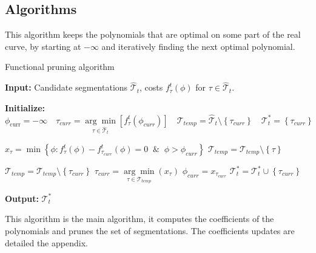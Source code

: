 \documentclass[11pt]{article}
\begin{document}
\subsection{Algorithms}
\label{appendix:algorithms}
This algorithm keeps the polynomials that are optimal on some part of the real curve, by starting at $-\infty$ and iteratively finding the next optimal polynomial.
\begin{algorithm}[H]
    \caption{Functional pruning algorithm}
    \begin{algorithmic}[1]
        \State \textbf{Input:} Candidate segmentations $\hat{\mathcal{T}}_{t}$, costs $f^{t}_{{\tau}}(\phi)$ for ${\tau}\in\hat{\mathcal{T}}_{t}$.

        \State \textbf{Initialize:} $\phi_\text{curr}=-\infty \quad {\tau}_{curr}=\underset{{\tau}\in\hat{\mathcal{T}}_{t}}{ \arg\min}\left[f^{t}_{{\tau}}(\phi_{curr})\right]\quad \mathcal{T}_{temp}=\hat{\mathcal{T}}_{t}\setminus \left\{\tau_{curr}\right\}\quad \mathcal{T}^*_t=\left\{\tau_{curr}\right\}$


        \State $x_{\tau}=\min\left\{\phi:f^{t}_{\tau}(\phi)-f^{t}_{{\tau}_{curr}}(\phi)=0\;\;\&\;\;\phi>\phi_{curr}\right\}$
        \State $\mathcal{T}_{temp}=\mathcal{T}_{temp}\setminus\left\{\tau\right\}$
        \EndIf
        \EndFor

        \State $\mathcal{T}_{temp}=\mathcal{T}_{temp}\setminus \left\{\tau_{curr}\right\}$
        \State $\tau_{curr}=\underset{\tau\in\mathcal{T}_{temp}}{\arg\min}(x_{\tau})$
        \State $\phi_{curr}=x_{\tau_{curr}}$
        \State $\mathcal{T}^*_t=\mathcal{T}^*_t\cup\left\{\tau_{curr}\right\}$
        \EndWhile

        \State \textbf{Output:} $\mathcal{T}^*_t$
    \end{algorithmic}
\end{algorithm}
This algorithm is the main algorithm, it computes the coefficients of the polynomials and prunes the set of segmentations. The coefficients updates are detailed the appendix.
\end{document}

